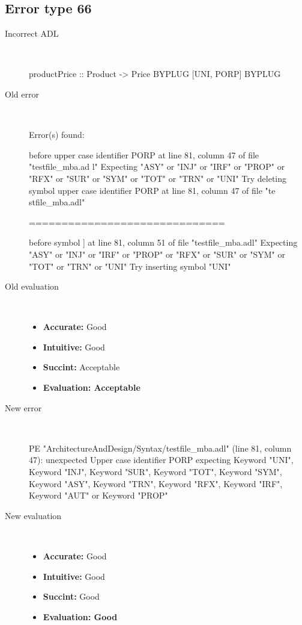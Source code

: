 \hrulefill

\subsection{Error type 66}
  \begin{description}
  \item[Incorrect ADL]~\\
\begin{adl}
productPrice :: Product -> Price BYPLUG [UNI, PORP] BYPLUG \end{adl}
  \item[Old error]~\\
\begin{haskell}
Error(s) found:

before upper case identifier PORP at line 81, column 47 of file "testfile_mba.ad
l"
Expecting "ASY" or "INJ" or "IRF" or "PROP" or "RFX" or "SUR" or "SYM" or "TOT"
or "TRN" or "UNI"
Try deleting symbol upper case identifier PORP at line 81, column 47 of file "te
stfile_mba.adl"

==============================

before symbol ] at line 81, column 51 of file "testfile_mba.adl"
Expecting "ASY" or "INJ" or "IRF" or "PROP" or "RFX" or "SUR" or "SYM" or "TOT"
or "TRN" or "UNI"
Try inserting symbol "UNI"

\end{haskell}
  \item[Old evaluation]~\\
    \begin{itemize}
    \item \textbf{Accurate:} Good
    \item \textbf{Intuitive:} Good
    \item \textbf{Succint:} Acceptable
    \item \textbf{Evaluation: Acceptable}
    \end{itemize}
  \item[New error]~\\
\begin{haskell}
PE "ArchitectureAndDesign/Syntax/testfile_mba.adl" (line 81, column 47):
unexpected Upper case identifier PORP
expecting Keyword "UNI", Keyword "INJ", Keyword "SUR", Keyword "TOT", Keyword "SYM", Keyword "ASY", Keyword "TRN", Keyword "RFX", Keyword "IRF", Keyword "AUT" or Keyword "PROP"\end{haskell}
  \item[New evaluation]~\\
    \begin{itemize}
    \item \textbf{Accurate:} Good
    \item \textbf{Intuitive:} Good
    \item \textbf{Succint:} Good
    \item \textbf{Evaluation: Good
}
    \end{itemize}
  \end{description}

